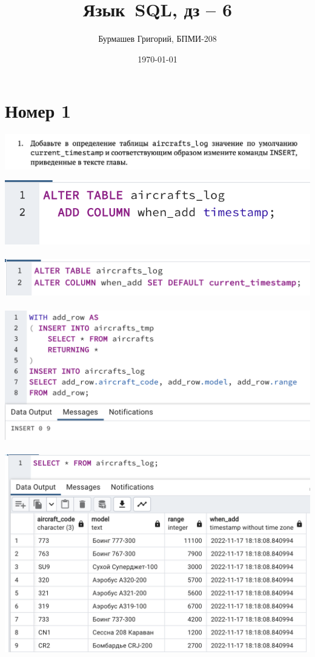 \documentclass[a4paper,12pt]{article}
\author{Бурмашев Григорий, БПМИ-208}
\title{Язык SQL, дз -- 6}
\date{\today}
\begin{document}
\maketitle
\clearpage
\section*{Номер 1}
\begin{center}
\includegraphics[scale=0.8]{t1.png}
\end{center}
\includegraphics[scale=0.8]{11.png}
\\\\
\includegraphics[scale=0.8]{12.png}
\\\\
\includegraphics[scale=0.8]{13.png}
\\\\
\includegraphics[scale=0.8]{14.png}
\end{document}

